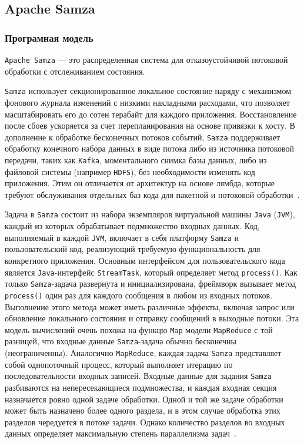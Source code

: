 \subsection{Apache Samza}

\subsubsection{Програмная модель}

\texttt{Apache Samza} --- это распределенная система для отказоустойчивой потоковой обработки с отслеживанием состояния. 

\texttt{Samza} использует секционированное локальное состояние наряду с механизмом фонового журнала изменений с низкими накладными расходами, что позволяет масштабировать его до сотен терабайт для каждого приложения. 
Восстановление после сбоев ускоряется за счет перепланирования на основе привязки к хосту. 
В дополнение к обработке бесконечных потоков событий, \texttt{Samza} поддерживает обработку конечного набора данных в виде потока либо из источника потоковой передачи, таких как \texttt{Kafka}, моментального снимка базы данных, либо из файловой системы (например \texttt{HDFS}), без необходимости изменять код приложения. 
Этим он отличается от архитектур на основе лямбда, которые требуют обслуживания отдельных баз кода для пакетной и потоковой обработки~\cite{10.14778/3137765.3137770}.

Задача в \texttt{Samza} состоит из набора экземпляров виртуальной машины \texttt{Java} (\texttt{JVM}), каждый из которых обрабатывает подмножество входных данных. 
Код, выполняемый в каждой \texttt{JVM}, включает в себя платформу \texttt{Samza} и пользовательский код, реализующий требуемую функциональность для конкретного приложения. 
Основным интерфейсом для пользовательского кода является \texttt{Java}-интерфейс \texttt{StreamTask}, который определяет метод \texttt{process()}. 
Как только \texttt{Samza}-задача развернута и инициализирована, фреймворк вызывает метод \texttt{process()} один раз для каждого сообщения в любом из входных потоков. 
Выполнение этого метода может иметь различные эффекты, включая запрос или обновление локального состояния и отправку сообщений в выходные потоки. 
Эта модель вычислений очень похожа на функцю \texttt{Map} модели \texttt{MapReduce} с той разницей, что входные данные \texttt{Samza}-задача обычно бесконечны (неограниченны). 
Аналогично \texttt{MapReduce}, каждая задача \texttt{Samza} представляет собой однопоточный процесс, который выполняет итерацию по последовательности входных записей. 
Входные данные для задания \texttt{Samza} разбиваются на непересекающиеся подмножества, и каждая входная секция назначается ровно одной задаче обработки. 
Одной и той же задаче обработки может быть назначено более одного раздела, и в этом случае обработка этих разделов чередуется в потоке задачи. 
Однако количество разделов во входных данных определяет максимальную степень параллелизма задач~\cite{Kleppmann2018}.


